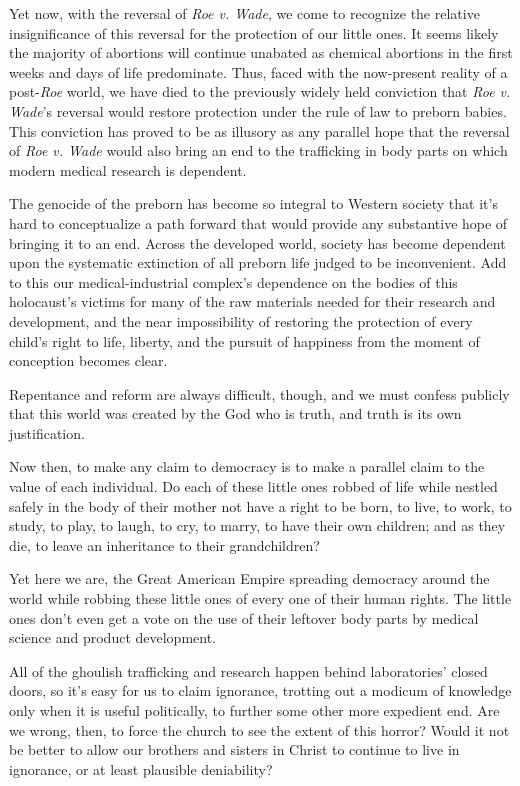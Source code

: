 \documentclass[
]{book}
\begin{document}
Yet now, with the reversal of \emph{Roe v. Wade}, we come to recognize the relative insignificance of this reversal for the protection of our little ones. It seems likely the majority of abortions will continue unabated as chemical abortions in the first weeks and days of life predominate. Thus, faced with the now-present reality of a post-\emph{Roe} world, we have died to the previously widely held conviction that \emph{Roe v. Wade}'s reversal would restore protection under the rule of law to preborn babies. This conviction has proved to be as illusory as any parallel hope that the reversal of \emph{Roe v. Wade} would also bring an end to the trafficking in body parts on which modern medical research is dependent.

The genocide of the preborn has become so integral to Western society that it's hard to conceptualize a path forward that would provide any substantive hope of bringing it to an end. Across the developed world, society has become dependent upon the systematic extinction of all preborn life judged to be inconvenient. Add to this our medical-industrial complex's dependence on the bodies of this holocaust's victims for many of the raw materials needed for their research and development, and the near impossibility of restoring the protection of every child's right to life, liberty, and the pursuit of happiness from the moment of conception becomes clear.

Repentance and reform are always difficult, though, and we must confess publicly that this world was created by the God who is truth, and truth is its own justification.

Now then, to make any claim to democracy is to make a parallel claim to the value of each individual. Do each of these little ones robbed of life while nestled safely in the body of their mother not have a right to be born, to live, to work, to study, to play, to laugh, to cry, to marry, to have their own children; and as they die, to leave an inheritance to their grandchildren?

Yet here we are, the Great American Empire spreading democracy around the world while robbing these little ones of every one of their human rights. The little ones don't even get a vote on the use of their leftover body parts by medical science and product development.

All of the ghoulish trafficking and research happen behind laboratories' closed doors, so it's easy for us to claim ignorance, trotting out a modicum of knowledge only when it is useful politically, to further some other more expedient end. Are we wrong, then, to force the church to see the extent of this horror? Would it not be better to allow our brothers and sisters in Christ to continue to live in ignorance, or at least plausible deniability?
\end{document}
